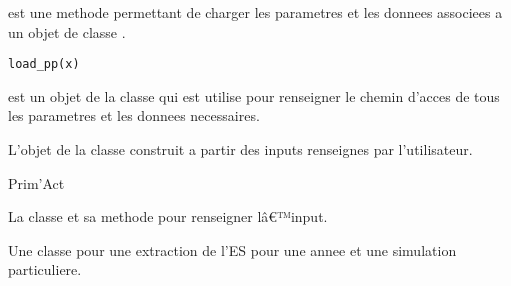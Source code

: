 \documentclass[a4paper]{book}
\begin{document}
%
\begin{Description}\relax
{} est une methode permettant de charger les parametres et les donnees associees a un
objet de classe .
\end{Description}
%
\begin{Usage}
\begin{verbatim}
load_pp(x)
\end{verbatim}
\end{Usage}
%
\begin{Arguments}
\begin{ldescription}
\item[\code{x}] est un objet de la classe  qui est utilise pour renseigner le chemin
d'acces de tous les parametres et les donnees necessaires.
\end{ldescription}
\end{Arguments}
%
\begin{Value}
L'objet de la classe  construit a partir des inputs renseignes par l'utilisateur.
\end{Value}
%
\begin{Author}\relax
Prim'Act
\end{Author}
%
\begin{SeeAlso}\relax
La classe  et sa methode 
pour renseigner lâ€™input.
\end{SeeAlso}
%
\begin{Description}\relax
Une classe pour une extraction de l'ES pour une annee et une simulation particuliere.
\end{Description}
%
\end{document}
